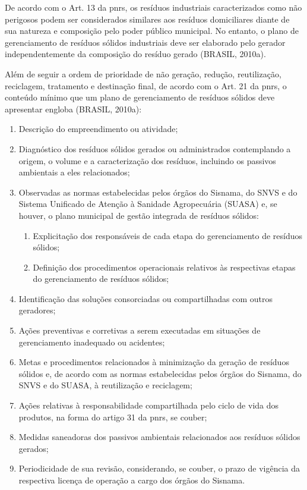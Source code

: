 	De acordo com o Art. 13 da \gls{pnrs}, os resíduos industriais caracterizados como não perigosos podem ser considerados similares aos resíduos domiciliares diante de sua natureza e composição pelo poder público municipal. No entanto, o plano de gerenciamento de resíduos sólidos industriais deve ser elaborado pelo gerador independentemente da composição do resíduo gerado (BRASIL, 2010a).

	Além de seguir a ordem de prioridade de não geração, redução, reutilização, reciclagem, tratamento e destinação final, de acordo com o Art. 21 da \gls{pnrs}, o conteúdo mínimo que um plano de gerenciamento de resíduos sólidos deve apresentar engloba (BRASIL, 2010a):
	
	\begin{enumerate}[label=\Roman*]
		\item Descrição do empreendimento ou atividade;
		\item Diagnóstico dos resíduos sólidos gerados ou administrados contemplando a origem, o volume e a caracterização dos resíduos, incluindo os passivos ambientais a eles relacionados;
		\item Observadas as normas estabelecidas pelos órgãos do Sisnama, do SNVS e do Sistema Unificado de Atenção à Sanidade Agropecuária (SUASA) e, se houver, o plano municipal de gestão integrada de resíduos sólidos:
		\begin{enumerate}[label=(\alph*)] 
			\item Explicitação dos responsáveis de cada etapa do gerenciamento de resíduos sólidos;
			\item Definição dos procedimentos operacionais relativos às respectivas etapas do gerenciamento de resíduos sólidos;
		\end{enumerate}
		\item Identificação das soluções consorciadas ou compartilhadas com outros geradores;
		\item Ações preventivas e corretivas a serem executadas em situações de gerenciamento inadequado ou acidentes;
		\item Metas e procedimentos relacionados à minimização da geração de resíduos sólidos e, de acordo com as normas estabelecidas pelos órgãos do Sisnama, do SNVS e do SUASA, à reutilização e reciclagem;
		\item Ações relativas à responsabilidade compartilhada pelo ciclo de vida dos produtos, na forma do artigo 31 da \gls{pnrs}, se couber;
		\item Medidas saneadoras dos passivos ambientais relacionados aos resíduos sólidos gerados;
		\item Periodicidade de sua revisão, considerando, se couber, o prazo de vigência da respectiva licença de operação a cargo dos órgãos do Sisnama.
	\end{enumerate}

